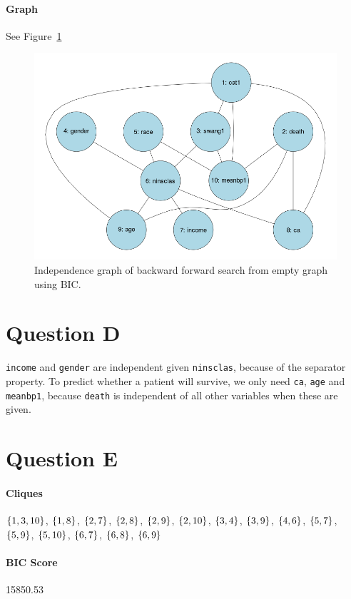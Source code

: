 \documentclass[12pt]{article}
\theoremstyle{definition}
\begin{document}
\paragraph{Graph} See Figure~\ref{fig:c}

\begin{figure}[H]
    \centering
    \includegraphics[width=0.8\linewidth]{c.png}
    \caption{Independence graph of backward forward search from empty graph using BIC.}
\label{fig:c}
\end{figure}

\section*{Question D}
\texttt{income} and \texttt{gender} are independent given \texttt{ninsclas}, because of the separator property.
To predict whether a patient will survive, we only need \texttt{ca}, \texttt{age} and \texttt{meanbp1}, because
\texttt{death} is independent of all other variables when these are given.

\section*{Question E}
\paragraph{Cliques}
$\set{1,3,10}$, $\set{1,8}$, $\set{2,7}$, $\set{2,8}$, $\set{2,9}$, $\set{2,10}$,
$\set{3,4}$, $\set{3,9}$, $\set{4,6}$, $\set{5,7}$, $\set{5,9}$, $\set{5,10}$,
$\set{6,7}$, $\set{6,8}$, $\set{6,9}$

\paragraph{BIC Score} 15850.53
\end{document}
